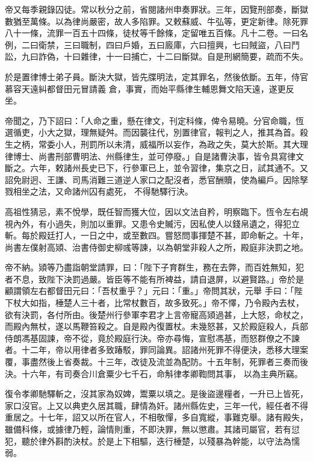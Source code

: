 \begin{pinyinscope}
 帝又每季親錄囚徒。常以秋分之前，省閱諸州申奏罪狀。三年，因覽刑部奏，斷獄數猶至萬條。以為律尚嚴密，故人多陷罪。又敕蘇威、牛弘等，更定新律。除死罪八十一條，流罪一百五十四條，徒杖等千餘條，定留唯五百條。凡十二卷。一曰名例，二曰衛禁，三曰職制，四曰戶婚，五曰廄庫，六曰擅興，七曰賊盜，八曰鬥訟，九曰詐偽，十曰雜律，十一曰捕亡，十二曰斷獄。自是刑網簡要，疏而不失。



 於是置律博士弟子員。斷決大獄，皆先牒明法，定其罪名，然後依斷。五年，侍官慕容天遠糾都督田元冒請義
 倉，事實，而始平縣律生輔恩舞文陷天遠，遂更反坐。



 帝聞之，乃下詔曰：「人命之重，懸在律文，刊定科條，俾令易曉。分官命職，恆選循吏，小大之獄，理無疑舛。而因襲往代，別置律官，報判之人，推其為首。殺生之柄，常委小人，刑罰所以未清，威福所以妄作，為政之失，莫大於斯。其大理律博士、尚書刑部曹明法、州縣律生，並可停廢。」自是諸曹決事，皆令具寫律文斷之。六年，敕諸州長史已下，行參軍已上，並令習律，集京之日，試其通不。又詔免尉迥、王謙、司馬消難三道逆人家口之配沒者，悉官酬贖，使為編戶。因除孥戮相坐之法，又命諸州囚有處死，
 不得馳驛行決。



 高祖性猜忌，素不悅學，既任智而獲大位，因以文法自矜，明察臨下。恆令左右覘視內外，有小過失，則加以重罪。又患令史贓污，因私使人以錢帛遺之，得犯立斬。每於殿廷打人，一日之中，或至數四。嘗怒問事揮楚不甚，即命斬之。十年，尚書左僕射高熲、治書侍御史柳彧等諫，以為朝堂非殺人之所，殿庭非決罰之地。



 帝不納。熲等乃盡詣朝堂請罪，曰：「陛下子育群生，務在去弊，而百姓無知，犯者不息，致陛下決罰過嚴。皆臣等不能有所裨益，請自退屏，以避賢路。」帝於是顧謂領左右都督田元曰：「吾杖重乎？」元曰：「重。」帝問其狀，元舉
 手曰：「陛下杖大如指，棰楚人三十者，比常杖數百，故多致死。」帝不懌，乃令殿內去杖，欲有決罰，各付所由。後楚州行參軍李君才上言帝寵高熲過甚，上大怒，命杖之，而殿內無杖，遂以馬鞭笞殺之。自是殿內復置杖。未幾怒甚，又於殿庭殺人，兵部侍朗馮基固諫，帝不從，竟於殿庭行決。帝亦尋悔，宣慰馮基，而怒群僚之不諫者。十二年，帝以用律者多致踳駁，罪同論異。詔諸州死罪不得便決，悉移大理案覆，事盡然後上省奏裁。十三年，改徒及流並為配防。十五年制，死罪者三奏而後決。十六年，有司奏合川倉粟少七千石，命斛律孝卿鞫問其事，
 以為主典所竊。



 復令孝卿馳驛斬之，沒其家為奴婢，鬻粟以填之。是後盜邊糧者，一升已上皆死，家口沒官。上又以典吏久居其職，肆情為奸。諸州縣佐史，三年一代，經任者不得重居之。十七年，詔又以所在官人，不相敬憚，多自寬縱，事難克舉。諸有殿失，雖備科條，或據律乃輕，論情則重，不即決罪，無以懲肅。其諸司屬官，若有愆犯，聽於律外斟酌決杖。於是上下相驅，迭行棰楚，以殘暴為幹能，以守法為懦弱。




\end{pinyinscope}
